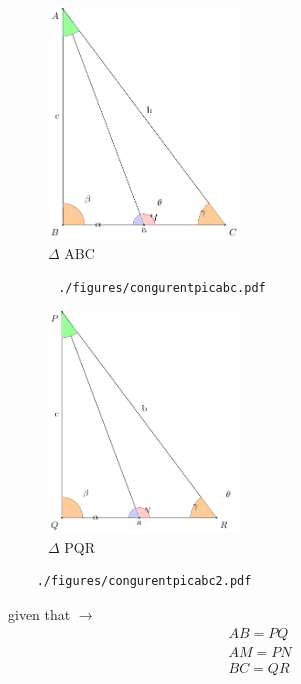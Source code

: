 \begin{enumerate}
\begin{enumerate}
		\begin{figure}[!htb]
				\centering
				\includegraphics[width=2.0in]{./figures/congurentpicabc.pdf}
				\caption{$\Delta$ ABC}
				\label{fig:triangle}
	    \end{figure}
        \begin{lstlisting}
       ./figures/congurentpicabc.pdf
        \end{lstlisting}
	   	\begin{figure}
				\centering
				\includegraphics[width=2.0in]{./figures/congurentpicabc2.pdf}
				\caption{$\Delta$ PQR }
				\label{fig:triangle2}
    	\end{figure}
    	\begin{lstlisting}
    ./figures/congurentpicabc2.pdf
    	\end{lstlisting}
    

		given that $\to$\\
		\begin{align}
			AB = PQ\\
			AM = PN\\
			BC = QR	
		\end{align}
	

\end{enumerate}
\end{enumerate}
